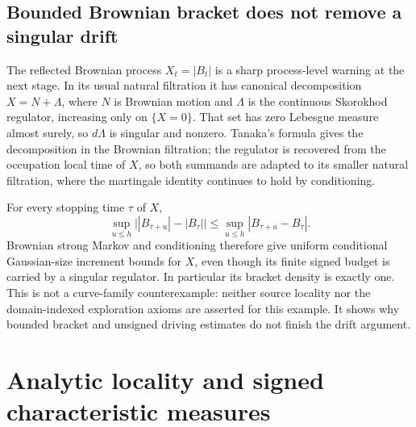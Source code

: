 \documentclass[11pt]{article}
\theoremstyle{definition}\newtheorem{definition}[theorem]{Definition}
\theoremstyle{remark}\newtheorem{remark}[theorem]{Remark}
\begin{document}
\subsection{Bounded Brownian bracket does not remove a singular drift}
\label{sec:reflected-driver-obstruction}

The reflected Brownian process $X_t=|B_t|$ is a sharp process-level
warning at the next stage. In its usual natural filtration it has
canonical decomposition $X=N+\Lambda$, where $N$ is Brownian motion
and $\Lambda$ is the continuous Skorokhod regulator, increasing only
on $\{X=0\}$. That set has zero Lebesgue measure almost surely, so
$d\Lambda$ is singular and nonzero. Tanaka's formula gives the
decomposition in the Brownian filtration; the regulator is recovered
from the occupation local time of $X$, so both summands are adapted
to its smaller natural filtration, where the martingale identity
continues to hold by conditioning.

For every stopping time $\tau$ of $X$,
\[
 \sup_{u\le h}\bigl||B_{\tau+u}|-|B_\tau|\bigr|
 \le\sup_{u\le h}|B_{\tau+u}-B_\tau|.
 \tag{RB1}
\]
Brownian strong Markov and conditioning therefore give uniform
conditional Gaussian-size increment bounds for $X$, even though its
finite signed budget is carried by a singular regulator. In particular
its bracket density is exactly one. This is not a curve-family
counterexample: neither source locality nor the domain-indexed
exploration axioms are asserted for this example. It shows why bounded
bracket and unsigned driving estimates do not finish the drift argument.

\section{Analytic locality and signed characteristic measures}
\label{sec:analytic-locality-budget}
\end{document}
